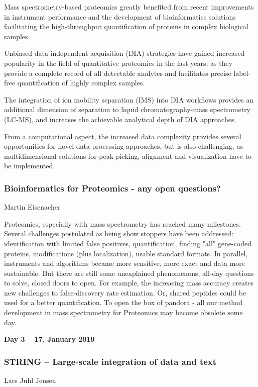 Mass spectrometry-based proteomics greatly benefited from recent improvements in instrument performance and the development of bioinformatics solutions facilitating the high-throughput quantification of proteins in complex biological samples.

Unbiased data-independent acquisition (DIA) strategies have gained increased popularity in the field of quantitative proteomics in the last years, as they provide a complete record of all detectable analytes and facilitates precise label-free quantification of highly complex samples.

The integration of ion mobility separation (IMS) into DIA workflows provides an additional dimension of separation to liquid chromatography-mass spectrometry (LC-MS), and increases the achievable analytical depth of DIA approaches.

From a computational aspect, the increased data complexity provides several opportunities for novel data processing approaches, but is also challenging, as multidimensional solutions for peak picking, alignment and visualization have to be implemented.

\subsubsection*{\color{eubicRed} Bioinformatics for Proteomics - any open questions?}
{\color{eubicGray}Martin Eisenacher}

Proteomics, especially with mass spectrometry has reached many milestones.
Several challenges postulated as being show stoppers have been addressed:
identification with limited false positives, quantification, finding "all"
gene-coded proteins, modifications (plus localization), usable standard
formats. In parallel, instruments and algorithms became more sensitive, more
exact and data more sustainable. But there are still some unexplained
phenomenons, all-day questions to solve, closed doors to open. For example, the
increasing mass accuracy creates new challenges to false-discovery rate
estimation. Or, shared peptides could be used for a better quantification. To
open the box of pandora - all our method development in mass spectrometry for
Proteomics may become obsolete some day.


\vspace{1cm}
\noindent\textbf{Day 3 -- 17. January 2019}

\subsubsection*{\color{eubicRed} STRING -- Large-scale integration of data and text}
{\color{eubicGray}Lars Juhl Jensen}

